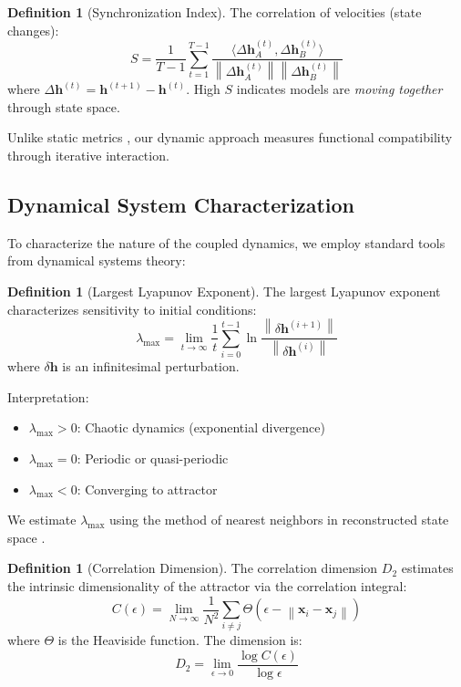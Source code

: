 \documentclass[10pt]{article} %
\theoremstyle{plain}
\theoremstyle{definition}
\newtheorem{definition}[theorem]{Definition}
\theoremstyle{remark}
\newcommand{\norm}[1]{\left\lVert#1\right\rVert}
\newcommand{\inner}[2]{\langle #1, #2 \rangle}
\newcommand{\vect}[1]{\bm{#1}}
\begin{document}
\begin{definition}[Synchronization Index]
The correlation of velocities (state changes):
\begin{equation}
    S = \frac{1}{T-1} \sum_{t=1}^{T-1} \frac{\inner{\Delta\vect{h}_A^{(t)}}{\Delta\vect{h}_B^{(t)}}}{\norm{\Delta\vect{h}_A^{(t)}} \norm{\Delta\vect{h}_B^{(t)}}}
\end{equation}
where $\Delta\vect{h}^{(t)} = \vect{h}^{(t+1)} - \vect{h}^{(t)}$. High $S$ indicates models are \textit{moving together} through state space.
\end{definition}

Unlike static metrics \citep{ding2021grounding}, our dynamic approach measures functional compatibility through iterative interaction.

\subsection{Dynamical System Characterization}

To characterize the nature of the coupled dynamics, we employ standard tools from dynamical systems theory:

\begin{definition}[Largest Lyapunov Exponent]
The largest Lyapunov exponent characterizes sensitivity to initial conditions:
\begin{equation}
    \lambda_{\max} = \lim_{t \to \infty} \frac{1}{t} \sum_{i=0}^{t-1} \ln \frac{\norm{\delta\vect{h}^{(i+1)}}}{\norm{\delta\vect{h}^{(i)}}}
\end{equation}
where $\delta\vect{h}$ is an infinitesimal perturbation.

Interpretation:
\begin{itemize}
    \item $\lambda_{\max} > 0$: Chaotic dynamics (exponential divergence)
    \item $\lambda_{\max} = 0$: Periodic or quasi-periodic
    \item $\lambda_{\max} < 0$: Converging to attractor
\end{itemize}
\end{definition}

We estimate $\lambda_{\max}$ using the method of nearest neighbors in reconstructed state space \citep{wolf1985}.

\begin{definition}[Correlation Dimension]
The correlation dimension $D_2$ estimates the intrinsic dimensionality of the attractor via the correlation integral:
\begin{equation}
    C(\epsilon) = \lim_{N \to \infty} \frac{1}{N^2} \sum_{i \neq j} \Theta(\epsilon - \norm{\vect{x}_i - \vect{x}_j})
\end{equation}
where $\Theta$ is the Heaviside function. The dimension is:
\begin{equation}
    D_2 = \lim_{\epsilon \to 0} \frac{\log C(\epsilon)}{\log \epsilon}
\end{equation}
\end{definition}
\end{document}
